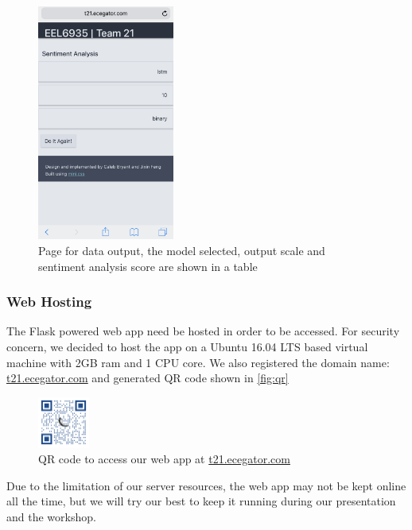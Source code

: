 \documentclass[conference]{IEEEtran}
\begin{document}
    \begin{figure}
        \center\includegraphics[width=0.4\textwidth]{figure/flask_output}
        \caption{Page for data output, the model selected, output scale and
        sentiment analysis score are shown in a table}
        \label{fig:flask_out}
    \end{figure}
    
\subsubsection{Web Hosting}
\label{model:front:host}
    The Flask powered web app need be hosted in order to be accessed. For security concern,
    we decided to host the app on a Ubuntu 16.04 LTS based virtual machine with 2GB ram and
    1 CPU core. We also registered the domain name: \url{t21.ecegator.com} and generated
    QR code shown in \autoref{fig:qr}
    \begin{figure}
        \center\includegraphics[width=0.15\textwidth]{figure/qr_website}
        \caption{QR code to access our web app at \url{t21.ecegator.com}}
        \label{fig:qr}
    \end{figure}
    Due to the limitation of our server resources, the web app may not be kept online
    all the time, but we will try our best to keep it running during our presentation
    and the workshop.
\end{document}
